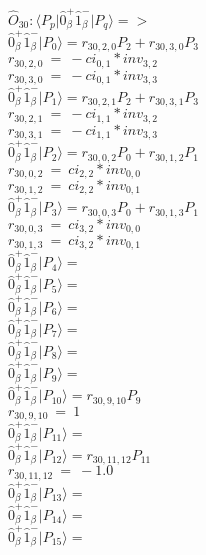 \documentclass[14pt]{article}
\begin{document}
    $\hat{O}_{30}:  \langle{P_p}\vert \hat{0}_{\beta}^{+}\hat{1}_{\beta}^{-} \vert{P_q}\rangle => $ \\ 
    $ \hat{0}_{\beta}^{+}\hat{1}_{\beta}^{-} \vert{P_{0}}\rangle = {r}_{30,2,0}P_{2}+{r}_{30,3,0}P_{3} $ \\ 
    ${r}_{30,2,0}\ =\ -{ci}_{0,1}*{inv}_{3,2} $ \\ 
    ${r}_{30,3,0}\ =\ -{ci}_{0,1}*{inv}_{3,3} $ \\ 
    $ \hat{0}_{\beta}^{+}\hat{1}_{\beta}^{-} \vert{P_{1}}\rangle = {r}_{30,2,1}P_{2}+{r}_{30,3,1}P_{3} $ \\ 
    ${r}_{30,2,1}\ =\ -{ci}_{1,1}*{inv}_{3,2} $ \\ 
    ${r}_{30,3,1}\ =\ -{ci}_{1,1}*{inv}_{3,3} $ \\ 
    $ \hat{0}_{\beta}^{+}\hat{1}_{\beta}^{-} \vert{P_{2}}\rangle = {r}_{30,0,2}P_{0}+{r}_{30,1,2}P_{1} $ \\ 
    ${r}_{30,0,2}\ =\ {ci}_{2,2}*{inv}_{0,0} $ \\ 
    ${r}_{30,1,2}\ =\ {ci}_{2,2}*{inv}_{0,1} $ \\ 
    $ \hat{0}_{\beta}^{+}\hat{1}_{\beta}^{-} \vert{P_{3}}\rangle = {r}_{30,0,3}P_{0}+{r}_{30,1,3}P_{1} $ \\ 
    ${r}_{30,0,3}\ =\ {ci}_{3,2}*{inv}_{0,0} $ \\ 
    ${r}_{30,1,3}\ =\ {ci}_{3,2}*{inv}_{0,1} $ \\ 
    $ \hat{0}_{\beta}^{+}\hat{1}_{\beta}^{-} \vert{P_{4}}\rangle =  $ \\ 
    $ \hat{0}_{\beta}^{+}\hat{1}_{\beta}^{-} \vert{P_{5}}\rangle =  $ \\ 
    $ \hat{0}_{\beta}^{+}\hat{1}_{\beta}^{-} \vert{P_{6}}\rangle =  $ \\ 
    $ \hat{0}_{\beta}^{+}\hat{1}_{\beta}^{-} \vert{P_{7}}\rangle =  $ \\ 
    $ \hat{0}_{\beta}^{+}\hat{1}_{\beta}^{-} \vert{P_{8}}\rangle =  $ \\ 
    $ \hat{0}_{\beta}^{+}\hat{1}_{\beta}^{-} \vert{P_{9}}\rangle =  $ \\ 
    $ \hat{0}_{\beta}^{+}\hat{1}_{\beta}^{-} \vert{P_{10}}\rangle = {r}_{30,9,10}P_{9} $ \\ 
    ${r}_{30,9,10}\ =\ 1 $ \\ 
    $ \hat{0}_{\beta}^{+}\hat{1}_{\beta}^{-} \vert{P_{11}}\rangle =  $ \\ 
    $ \hat{0}_{\beta}^{+}\hat{1}_{\beta}^{-} \vert{P_{12}}\rangle = {r}_{30,11,12}P_{11} $ \\ 
    ${r}_{30,11,12}\ =\ -1.0 $ \\ 
    $ \hat{0}_{\beta}^{+}\hat{1}_{\beta}^{-} \vert{P_{13}}\rangle =  $ \\ 
    $ \hat{0}_{\beta}^{+}\hat{1}_{\beta}^{-} \vert{P_{14}}\rangle =  $ \\ 
    $ \hat{0}_{\beta}^{+}\hat{1}_{\beta}^{-} \vert{P_{15}}\rangle =  $ \\ 
    
\end{document}
